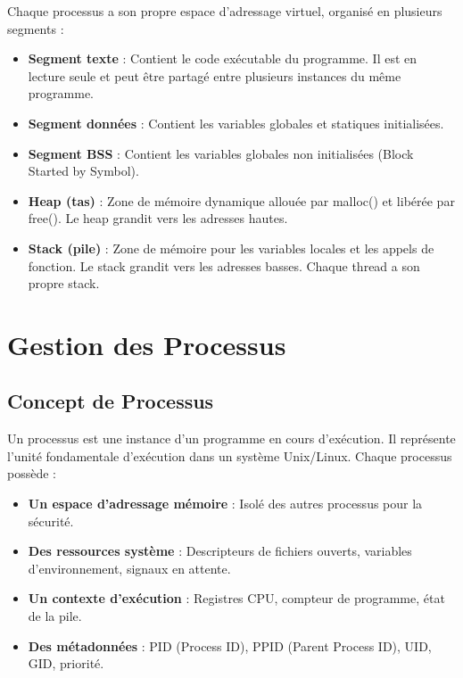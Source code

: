 \documentclass[12pt,a4paper]{article}
\begin{document}
Chaque processus a son propre espace d'adressage virtuel, organisé en plusieurs segments :

\begin{itemize}
    \item \textbf{Segment texte} : Contient le code exécutable du programme. Il est en lecture seule et peut être partagé entre plusieurs instances du même programme.
    
    \item \textbf{Segment données} : Contient les variables globales et statiques initialisées.
    
    \item \textbf{Segment BSS} : Contient les variables globales non initialisées (Block Started by Symbol).
    
    \item \textbf{Heap (tas)} : Zone de mémoire dynamique allouée par malloc() et libérée par free(). Le heap grandit vers les adresses hautes.
    
    \item \textbf{Stack (pile)} : Zone de mémoire pour les variables locales et les appels de fonction. Le stack grandit vers les adresses basses. Chaque thread a son propre stack.
\end{itemize}


\section{Gestion des Processus}

\subsection{Concept de Processus}

Un processus est une instance d'un programme en cours d'exécution. Il représente l'unité fondamentale d'exécution dans un système Unix/Linux. Chaque processus possède :

\begin{itemize}
    \item \textbf{Un espace d'adressage mémoire} : Isolé des autres processus pour la sécurité.
    
    \item \textbf{Des ressources système} : Descripteurs de fichiers ouverts, variables d'environnement, signaux en attente.
    
    \item \textbf{Un contexte d'exécution} : Registres CPU, compteur de programme, état de la pile.
    
    \item \textbf{Des métadonnées} : PID (Process ID), PPID (Parent Process ID), UID, GID, priorité.
\end{itemize}
\end{document}
